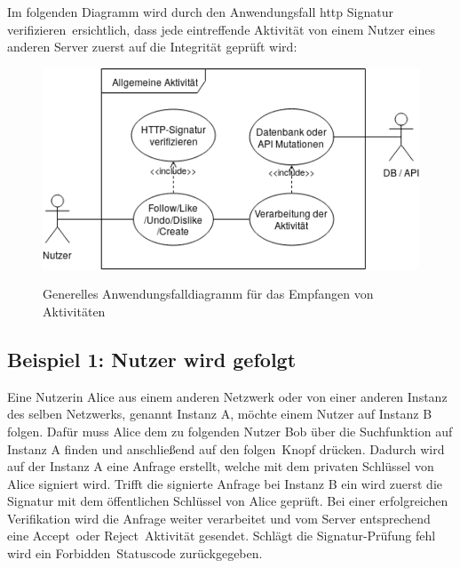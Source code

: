 \pagebreak
Im folgenden Diagramm wird durch den Anwendungsfall \glqq \gls{http} Signatur verifizieren\grqq~ersichtlich, dass jede eintreffende Aktivität von einem Nutzer eines anderen Server zuerst auf die Integrität geprüft wird:
\begin{figure}[h]
	\centering
	\includegraphics[scale=0.75]{figures/generel-activity-usecase.png}
	\label{fig:generel-activity-usecase}
	\caption{Generelles Anwendungsfalldiagramm für das Empfangen von Aktivitäten}
\end{figure}
\subsection{
	\textbf{Beispiel 1}: Nutzer wird gefolgt
}
\label{subsec:example-1}
Eine Nutzerin Alice aus einem anderen Netzwerk oder von einer anderen Instanz des selben Netzwerks, genannt Instanz A, möchte einem Nutzer auf Instanz B folgen. Dafür muss Alice dem zu folgenden Nutzer Bob über die Suchfunktion auf Instanz A finden und anschließend auf den \glqq folgen\grqq~Knopf drücken. Dadurch wird auf der Instanz A eine Anfrage erstellt, welche mit dem privaten Schlüssel von Alice signiert wird. Trifft die signierte Anfrage bei Instanz B ein wird zuerst die Signatur mit dem öffentlichen Schlüssel von Alice geprüft. Bei einer erfolgreichen Verifikation wird die Anfrage weiter verarbeitet und vom Server entsprechend eine \glqq Accept\grqq~oder \glqq Reject\grqq~Aktivität gesendet. Schlägt die Signatur-Prüfung fehl wird ein \glqq Forbidden\grqq~Statuscode zurückgegeben.\\

